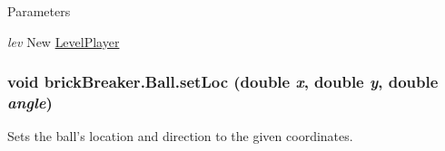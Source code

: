 \begin{DoxyParams}{Parameters}
\item[{\em lev}]New \hyperlink{classbrick_breaker_1_1_level_player}{LevelPlayer} \end{DoxyParams}
\hypertarget{classbrick_breaker_1_1_ball_adcc8436d899828fe7f3c788ed1daf8d6}{
\subsubsection[{setLoc}]{\setlength{\rightskip}{0pt plus 5cm}void brickBreaker.Ball.setLoc (double {\em x}, \/  double {\em y}, \/  double {\em angle})}}
\label{classbrick_breaker_1_1_ball_adcc8436d899828fe7f3c788ed1daf8d6}
Sets the ball's location and direction to the given coordinates.


